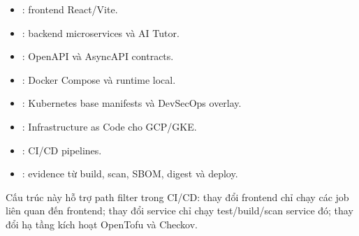 \begin{itemize}
  \item {}: frontend React/Vite.
  \item {}: backend microservices và AI Tutor.
  \item {}: OpenAPI và AsyncAPI contracts.
  \item {}: Docker Compose và runtime local.
  \item {}: Kubernetes base manifests và DevSecOps overlay.
  \item {}: Infrastructure as Code cho GCP/GKE.
  \item {}: CI/CD pipelines.
  \item {}: evidence từ build, scan, SBOM, digest và deploy.
\end{itemize}

Cấu trúc này hỗ trợ path filter trong CI/CD: thay đổi frontend chỉ chạy các job liên quan đến frontend; thay đổi service chỉ chạy test/build/scan service đó; thay đổi hạ tầng kích hoạt OpenTofu và Checkov.
